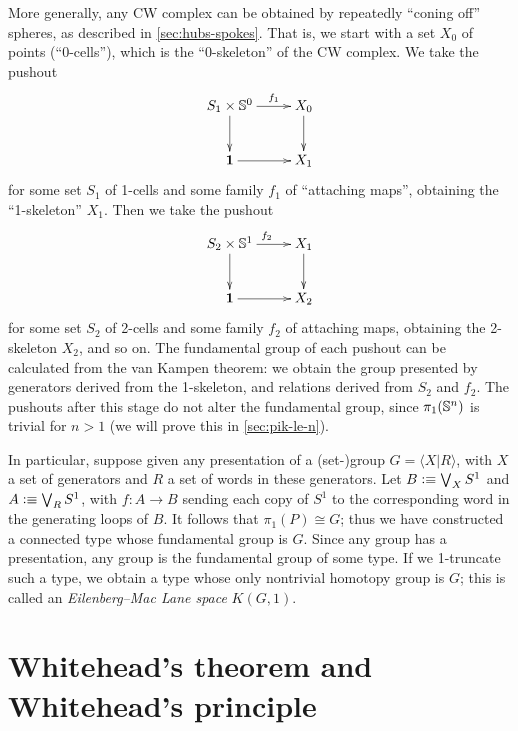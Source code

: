 \begin{eg}
  More generally, any CW complex can be obtained by repeatedly ``coning off'' spheres, as described in \autoref{sec:hubs-spokes}.
  That is, we start with a set $X_0$ of points (``0-cells''), which is the ``0-skeleton'' of the CW complex.
  We take the pushout
  \begin{equation*}
    \vcenter{\xymatrix{
        S_1 \times \Sn^0\ar[r]^-{f_1}\ar[d] &
        X_0\ar[d]\\
        \unit \ar[r] &
        X_1
      }}
  \end{equation*}
  for some set $S_1$ of 1-cells and some family $f_1$ of ``attaching maps'', obtaining the ``1-skeleton'' $X_1$.
  Then we take the pushout
  \begin{equation*}
    \vcenter{\xymatrix{
        S_2 \times \Sn^1\ar[r]^{f_2}\ar[d] &
        X_1\ar[d]\\
        \unit \ar[r] &
        X_2
      }}
  \end{equation*}
  for some set $S_2$ of 2-cells and some family $f_2$ of attaching maps, obtaining the 2-skeleton $X_2$, and so on.
  The fundamental group of each pushout can be calculated from the van Kampen theorem: we obtain the group presented by generators derived from the 1-skeleton, and relations derived from $S_2$ and $f_2$.
  The pushouts after this stage do not alter the fundamental group, since $\pi_1(\mathbb{S}^n)$ is trivial for $n>1$ (we will prove this in \autoref{sec:pik-le-n}).
\end{eg}

\begin{eg}\label{eg:kg1}
  In particular, suppose given any presentation of a (set-)group $G = \langle X | R \rangle$, with $X$ a set of generators and $R$ a set of words in these generators.
  Let $B\vcentcolon\equiv \bigvee_X S^1$ and $A\vcentcolon\equiv \bigvee_R S^1$, with $f:A\to B$ sending each copy of $S^1$ to the corresponding word in the generating loops of $B$.
  It follows that $\pi_1(P) \cong G$; thus we have constructed a connected type whose fundamental group is $G$.
  Since any group has a presentation, any group is the fundamental group of some type.
  If we 1-truncate such a type, we obtain a type whose only nontrivial homotopy group is $G$; this is called an \emph{Eilenberg--Mac Lane space} $K(G,1)$.
\end{eg}


\section{Whitehead's theorem and Whitehead's principle}
\label{sec:whitehead}

